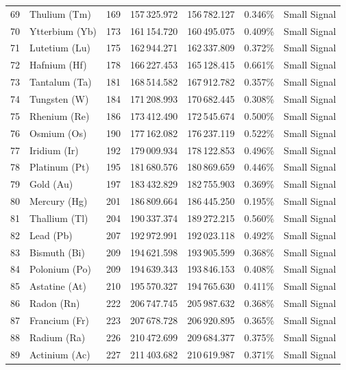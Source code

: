 \begin{small}
\begin{longtable}{r l r r r r l}
69 & Thulium (Tm)      & 169 & 157\,325.972 & 156\,782.127 & 0.346\% & Small Signal \\
70 & Ytterbium (Yb)    & 173 & 161\,154.720 & 160\,495.075 & 0.409\% & Small Signal \\
71 & Lutetium (Lu)     & 175 & 162\,944.271 & 162\,337.809 & 0.372\% & Small Signal \\
72 & Hafnium (Hf)      & 178 & 166\,227.453 & 165\,128.415 & 0.661\% & Small Signal \\
73 & Tantalum (Ta)     & 181 & 168\,514.582 & 167\,912.782 & 0.357\% & Small Signal \\
74 & Tungsten (W)      & 184 & 171\,208.993 & 170\,682.445 & 0.308\% & Small Signal \\
75 & Rhenium (Re)      & 186 & 173\,412.490 & 172\,545.674 & 0.500\% & Small Signal \\
76 & Osmium (Os)       & 190 & 177\,162.082 & 176\,237.119 & 0.522\% & Small Signal \\
77 & Iridium (Ir)      & 192 & 179\,009.934 & 178\,122.853 & 0.496\% & Small Signal \\
78 & Platinum (Pt)     & 195 & 181\,680.576 & 180\,869.659 & 0.446\% & Small Signal \\
79 & Gold (Au)         & 197 & 183\,432.829 & 182\,755.903 & 0.369\% & Small Signal \\
80 & Mercury (Hg)      & 201 & 186\,809.664 & 186\,445.250 & 0.195\% & Small Signal \\
81 & Thallium (Tl)     & 204 & 190\,337.374 & 189\,272.215 & 0.560\% & Small Signal \\
82 & Lead (Pb)         & 207 & 192\,972.991 & 192\,023.118 & 0.492\% & Small Signal \\
83 & Bismuth (Bi)      & 209 & 194\,621.598 & 193\,905.599 & 0.368\% & Small Signal \\
84 & Polonium (Po)     & 209 & 194\,639.343 & 193\,846.153 & 0.408\% & Small Signal \\
85 & Astatine (At)     & 210 & 195\,570.327 & 194\,765.630 & 0.411\% & Small Signal \\
86 & Radon (Rn)        & 222 & 206\,747.745 & 205\,987.632 & 0.368\% & Small Signal \\
\midrule
87 & Francium (Fr)     & 223 & 207\,678.728 & 206\,920.895 & 0.365\% & Small Signal \\
88 & Radium (Ra)       & 226 & 210\,472.699 & 209\,684.377 & 0.375\% & Small Signal \\
89 & Actinium (Ac)     & 227 & 211\,403.682 & 210\,619.987 & 0.371\% & Small Signal \\

\end{longtable}
\end{small}
